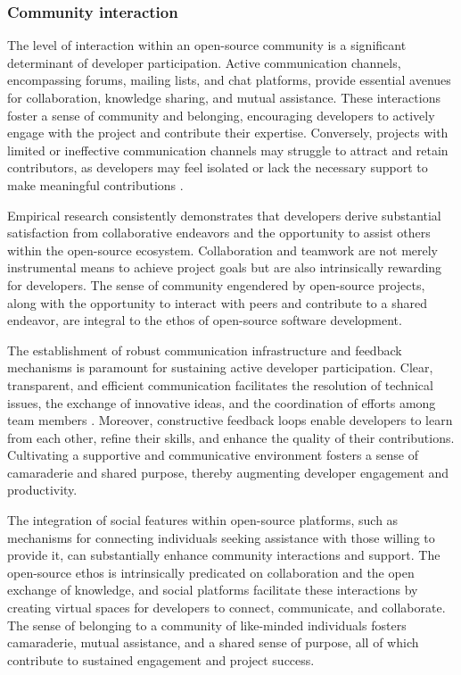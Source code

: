 \subsubsection{Community interaction}
The level of interaction within an open-source community is a significant determinant of developer participation. Active communication channels, encompassing forums, mailing lists, and chat platforms, provide essential avenues for collaboration, knowledge sharing, and mutual assistance. These interactions foster a sense of community and belonging, encouraging developers to actively engage with the project and contribute their expertise. Conversely, projects with limited or ineffective communication channels may struggle to attract and retain contributors, as developers may feel isolated or lack the necessary support to make meaningful contributions \cite{05bitzer2007intrinsic,11gerosa2021shifting,20freeman2007material}.


Empirical research consistently demonstrates that developers derive substantial satisfaction from collaborative endeavors and the opportunity to assist others within the open-source ecosystem. Collaboration and teamwork are not merely instrumental means to achieve project goals but are also intrinsically rewarding for developers. The sense of community engendered by open-source projects, along with the opportunity to interact with peers and contribute to a shared endeavor, are integral to the ethos of open-source software development.

The establishment of robust communication infrastructure and feedback mechanisms is paramount for sustaining active developer participation. Clear, transparent, and efficient communication facilitates the resolution of technical issues, the exchange of innovative ideas, and the coordination of efforts among team members \cite{05bitzer2007intrinsic,13li2012leadership}. Moreover, constructive feedback loops enable developers to learn from each other, refine their skills, and enhance the quality of their contributions. Cultivating a supportive and communicative environment fosters a sense of camaraderie and shared purpose, thereby augmenting developer engagement and productivity.

The integration of social features within open-source platforms, such as mechanisms for connecting individuals seeking assistance with those willing to provide it, can substantially enhance community interactions and support. The open-source ethos is intrinsically predicated on collaboration and the open exchange of knowledge, and social platforms facilitate these interactions by creating virtual spaces for developers to connect, communicate, and collaborate. The sense of belonging to a community of like-minded individuals fosters camaraderie, mutual assistance, and a shared sense of purpose, all of which contribute to sustained engagement and project success.

